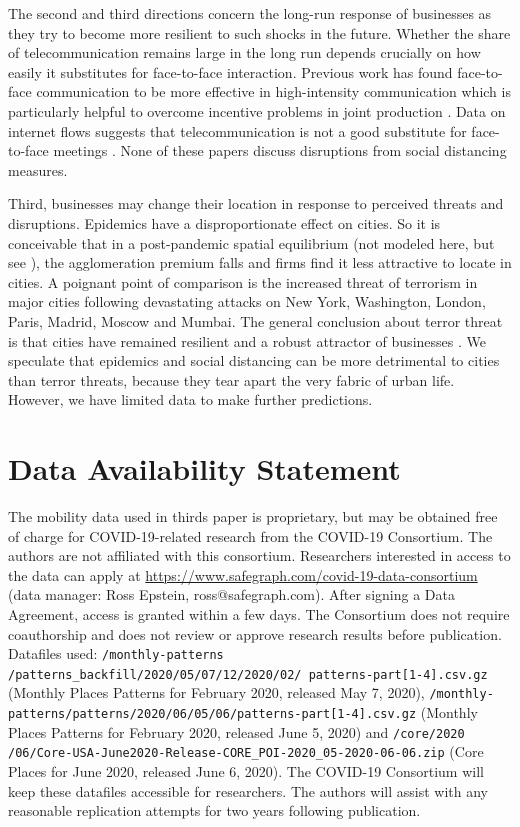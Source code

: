 \documentclass[10pt,letterpaper]{article}
\begin{document}
The second and third directions concern the long-run response of businesses as they try to become more resilient to such shocks in the future. Whether the share of telecommunication remains large in the long run depends crucially on how easily it substitutes for face-to-face interaction. Previous work has found face-to-face communication to be more effective in high-intensity communication which is particularly helpful to overcome incentive problems in joint production \cite{Gaspar1998-gy,Storper2004-mg}. Data on internet flows suggests that telecommunication is not a good substitute for face-to-face meetings \cite{Cuberes2013-js}. None of these papers discuss disruptions from social distancing measures. 

Third, businesses may change their location in response to perceived threats and disruptions. Epidemics have a disproportionate effect on cities. So it is conceivable that in a post-pandemic spatial equilibrium (not modeled here, but see \cite{Tian2019-wq}), the agglomeration premium falls and firms find it less attractive to locate in cities. A poignant point of comparison is the increased threat of terrorism in major cities following devastating attacks on New York, Washington, London, Paris, Madrid, Moscow and Mumbai. The general conclusion about terror threat is that cities have remained resilient and a robust attractor of businesses \cite{Glaeser2002-mw,Harrigan2002-ik}. We speculate that epidemics and social distancing can be more detrimental to cities than terror threats, because they tear apart the very fabric of urban life. However, we have limited data to make further predictions.

\section*{Data Availability Statement}
The mobility data used in thirds paper \cite{SafeGraph2020-gn} is proprietary, but may be obtained free of charge for COVID-19-related research from the COVID-19 Consortium. The authors are not affiliated with this consortium. Researchers interested in access to the data can apply at \url{https://www.safegraph.com/covid-19-data-consortium} (data manager: Ross Epstein, ross@safegraph.com). After signing a Data Agreement, access is granted within a few days. The Consortium does not require coauthorship and does not review or approve research results before publication. Datafiles used: \texttt{/monthly-patterns /patterns\_backfill/2020/05/07/12/2020/02/ patterns-part[1-4].csv.gz} (Monthly Places Patterns for February 2020, released May 7, 2020), \texttt{/monthly-patterns/patterns/2020/06/05/06/patterns-part[1-4].csv.gz} (Monthly Places Patterns for February 2020, released June 5, 2020) and \texttt{/core/2020 /06/Core-USA-June2020-Release-CORE\_POI-2020\_05-2020-06-06.zip} (Core Places for June 2020, released June 6, 2020). The COVID-19 Consortium will keep these datafiles accessible for researchers. The authors will assist with any reasonable replication attempts for two years following publication.
\end{document}
